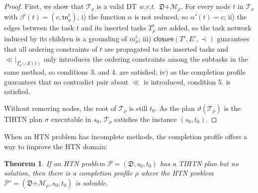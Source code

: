 \documentclass[letterpaper]{article} %
\newtheorem{theorem}{Theorem}
\newcommand{\HtnDomain}{\mathfrak{D}}
\newcommand{\Methods}{\mathcal{M}}
\renewcommand{\P}{\mathcal{P}}
\newcommand{\tn}{\mathsf{tn}}
\newcommand{\plan}{\sigma}
\newcommand{\Dtree}{\mathcal{T}}
\newcommand{\yield}{\vartheta}
\newcommand{\aspplus}{\textsf{+}}
\newcommand{\aspprec}{\ll}
\newcommand{\improveFunction}{\rho}
\newcommand{\closure}{\mathsf{closure}}
\begin{document}
\begin{proof}
First, we show that $\Dtree_{\improveFunction}$ is a valid DT \emph{w.r.t.}\ $\HtnDomain \aspplus \Methods_{\improveFunction}$.
For every node $t$ in $\Dtree_\improveFunction$ with $\beta'(t)\!=\!(c,\tn_\improveFunction^t)$, i) the function $\alpha$ is not reduced, so $\alpha'(t)\!=\!c$; ii) the edges between the task $t$ and its inserted tasks $T_\improveFunction^t$ are added, so the task network induced by its children is a grounding of $m_\improveFunction^t$; iii) $\closure(T',E',\prec)$ guarantees that all ordering constraints of $t$ are propagated to the inserted tasks and ${\aspprec}|_{T^t_\improveFunction \cup E(t)}$ only introduces the ordering constraints among the subtasks in the same method, so conditions 3. and 4. are satisfied;
iv) as the completion profile guarantees that no contradict pair about $\aspprec$ is introduced, condition 5. is satisfied.

Without removing nodes, the root of $\Dtree_{\improveFunction}$ is still $t_0$.
As the plan $\yield(\Dtree_{\improveFunction})$ is the TIHTN plan $\plan$ executable in $s_0$, $\Dtree_{\improveFunction}$ satisfies the instance $(s_0,t_0)$.
\end{proof}


When an HTN problem has incomplete methods, the completion profile offers a way to improve the HTN domain: %

\begin{theorem}\label{thm:repair_htn}
If an HTN problem $\P{=}(\HtnDomain,s_0,t_0)$
has a TIHTN plan but no solution, then there is a completion profile $\improveFunction$ where the HTN problem $\P'=(\HtnDomain \aspplus \Methods_\improveFunction,s_0,t_0)$ is solvable.
\end{theorem}
\end{document}
